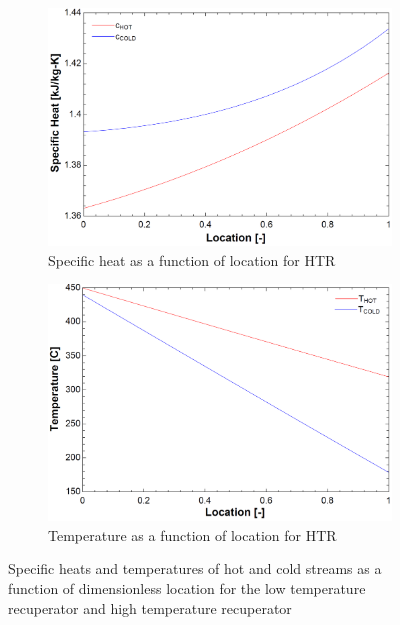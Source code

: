\begin{figure}
\begin{subfigure}[b]{0.45\textwidth}
        \includegraphics[width=\textwidth]{Definitions/c-vs-p-htr.pdf}
        \caption[]%
        {{\small Specific heat as a function of location for HTR}}
        \label{graph-c-vs-p-htr}
    \end{subfigure}
    \hfill
    \begin{subfigure}[b]{0.45\textwidth}
        \includegraphics[width=\textwidth]{Definitions/t-vs-p-htr.pdf}
        \caption[]%
        {{\small Temperature as a function of location for HTR}}
        \label{graph-t-vs-p-htr}
    \end{subfigure}
    \caption{Specific heats and temperatures of hot and cold streams as a function of dimensionless location for the low temperature recuperator and high temperature recuperator}
    \label{graphs-t-c-vs-p} 
\end{figure}

